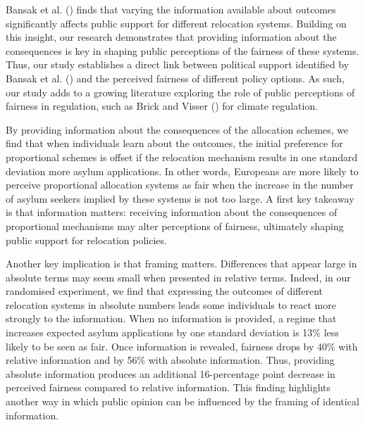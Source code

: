\documentclass[
  12pt,
  a4paper,
]{article}
\begin{document}
Bansak et al. () finds that varying the information available about outcomes significantly affects public support for different relocation systems. Building on this insight, our research demonstrates that providing information about the consequences is key in shaping public perceptions of the fairness of these systems. Thus, our study establishes a direct link between political support identified by Bansak et al. () and the perceived fairness of different policy options. As such, our study adds to a growing literature exploring the role of public perceptions of fairness in regulation, such as Brick and Visser () for climate regulation.

By providing information about the consequences of the allocation schemes, we find that when individuals learn about the outcomes, the initial preference for proportional schemes is offset if the relocation mechanism results in one standard deviation more asylum applications. In other words, Europeans are more likely to perceive proportional allocation systems as fair when the increase in the number of asylum seekers implied by these systems is not too large. A first key takeaway is that information matters: receiving information about the consequences of proportional mechanisms may alter perceptions of fairness, ultimately shaping public support for relocation policies.

Another key implication is that framing matters. Differences that appear large in absolute terms may seem small when presented in relative terms. Indeed, in our randomised experiment, we find that expressing the outcomes of different relocation systems in absolute numbers leads some individuals to react more strongly to the information. When no information is provided, a regime that increases expected asylum applications by one standard deviation is 13\% less likely to be seen as fair. Once information is revealed, fairness drops by 40\% with relative information and by 56\% with absolute information. Thus, providing absolute information produces an additional 16-percentage point decrease in perceived fairness compared to relative information. This finding highlights another way in which public opinion can be influenced by the framing of identical information.
\end{document}
